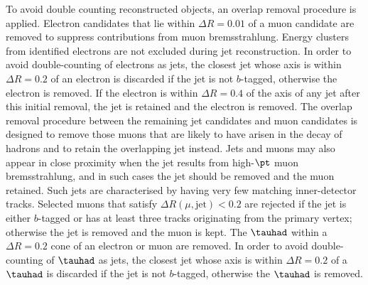 \documentclass[PAPER, coverpage, atlasdraft=true, texlive=2016, UKenglish]{\ATLASLATEXPATH atlasdoc}
\begin{document}
To avoid double counting reconstructed objects, an overlap removal procedure is applied.
Electron candidates that lie 
within $\Delta R = 0.01$ of a muon candidate are removed to suppress contributions from muon bremsstrahlung. 
Energy clusters from identified electrons are not excluded during jet reconstruction. 
In order to avoid double-counting of electrons as jets, the closest jet whose axis is within ${\Delta}R = 0.2$ of an electron 
is discarded if the jet is not $b$-tagged, otherwise the electron is removed.
If the electron is within ${\Delta}R = 0.4$ of the axis of any jet after this initial removal, the jet is retained and  the electron is removed.
The overlap removal procedure between the remaining jet candidates and muon candidates is designed to remove those muons 
that are likely to have arisen in the decay of hadrons and to retain the overlapping jet instead. 
Jets and muons may also appear in close proximity when the jet results from high-$\pt$ muon bremsstrahlung, 
and in such cases the jet should be removed and the muon retained. Such jets are characterised by having very 
few matching inner-detector tracks. Selected muons that satisfy $\Delta R(\mu,{\textrm{jet}}) < 0.2$ are rejected
if the jet is either $b$-tagged or has at least three tracks originating from the primary vertex; otherwise the jet is removed and the muon is kept.
The $\tauhad$ within a $\Delta R=0.2$ cone of an electron or muon are removed.
In order to avoid double-counting of $\tauhad$ as jets, the closest jet whose axis is
within ${\Delta}R = 0.2$ of a $\tauhad$ is discarded if the jet is not $b$-tagged, otherwise the $\tauhad$ is removed. 
\end{document}
